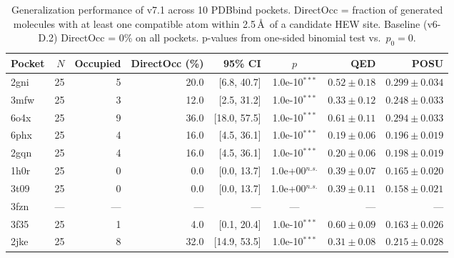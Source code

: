 \begin{table}[t]
\centering
\caption{Generalization performance of v7.1 across 10 PDBbind pockets.
DirectOcc = fraction of generated molecules with at least one compatible
atom within 2.5\,\AA\ of a candidate HEW site. Baseline (v6-D.2) DirectOcc
= 0\% on all pockets. p-values from one-sided binomial test vs.\ $p_0=0$.}
\label{tab:generalization}
\begin{tabular}{lrrrrcrr}
\toprule
Pocket & $N$ & Occupied & DirectOcc (\%) & 95\% CI & $p$ & QED & POSU \\
\midrule
2gni & 25 & 5 & 20.0 & [6.8, 40.7] & 1.0e-10$^{{***}}$ & $0.52\pm0.18$ & $0.299\pm0.034$ \\
3mfw & 25 & 3 & 12.0 & [2.5, 31.2] & 1.0e-10$^{{***}}$ & $0.33\pm0.12$ & $0.248\pm0.033$ \\
6o4x & 25 & 9 & 36.0 & [18.0, 57.5] & 1.0e-10$^{{***}}$ & $0.61\pm0.11$ & $0.294\pm0.033$ \\
6phx & 25 & 4 & 16.0 & [4.5, 36.1] & 1.0e-10$^{{***}}$ & $0.19\pm0.06$ & $0.196\pm0.019$ \\
2gqn & 25 & 4 & 16.0 & [4.5, 36.1] & 1.0e-10$^{{***}}$ & $0.20\pm0.06$ & $0.198\pm0.019$ \\
1h0r & 25 & 0 & 0.0 & [0.0, 13.7] & 1.0e+00$^{{n.s.}}$ & $0.39\pm0.07$ & $0.165\pm0.020$ \\
3t09 & 25 & 0 & 0.0 & [0.0, 13.7] & 1.0e+00$^{{n.s.}}$ & $0.39\pm0.11$ & $0.158\pm0.021$ \\
3fzn & — & — & — & — & — & — & — \\
3f35 & 25 & 1 & 4.0 & [0.1, 20.4] & 1.0e-10$^{{***}}$ & $0.60\pm0.09$ & $0.163\pm0.026$ \\
2jke & 25 & 8 & 32.0 & [14.9, 53.5] & 1.0e-10$^{{***}}$ & $0.31\pm0.08$ & $0.215\pm0.028$ \\
\bottomrule
\end{tabular}
\end{table}